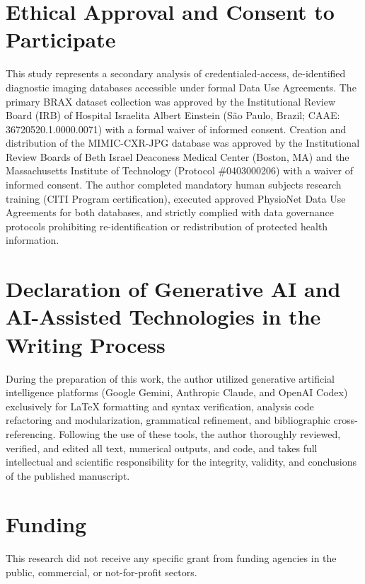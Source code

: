 \documentclass[preprint,12pt]{elsarticle}
\begin{document}
\section*{Ethical Approval and Consent to Participate}
This study represents a secondary analysis of credentialed-access, de-identified diagnostic imaging databases accessible under formal Data Use Agreements. The primary BRAX dataset collection was approved by the Institutional Review Board (IRB) of Hospital Israelita Albert Einstein (S\~ao Paulo, Brazil; CAAE: 36720520.1.0000.0071) with a formal waiver of informed consent. Creation and distribution of the MIMIC-CXR-JPG database was approved by the Institutional Review Boards of Beth Israel Deaconess Medical Center (Boston, MA) and the Massachusetts Institute of Technology (Protocol \#0403000206) with a waiver of informed consent. The author completed mandatory human subjects research training (CITI Program certification), executed approved PhysioNet Data Use Agreements for both databases, and strictly complied with data governance protocols prohibiting re-identification or redistribution of protected health information.

\section*{Declaration of Generative AI and AI-Assisted Technologies in the Writing Process}
During the preparation of this work, the author utilized generative artificial intelligence platforms (Google Gemini, Anthropic Claude, and OpenAI Codex) exclusively for LaTeX formatting and syntax verification, analysis code refactoring and modularization, grammatical refinement, and bibliographic cross-referencing. Following the use of these tools, the author thoroughly reviewed, verified, and edited all text, numerical outputs, and code, and takes full intellectual and scientific responsibility for the integrity, validity, and conclusions of the published manuscript.

\section*{Funding}
This research did not receive any specific grant from funding agencies in the public, commercial, or not-for-profit sectors.



\end{document}
